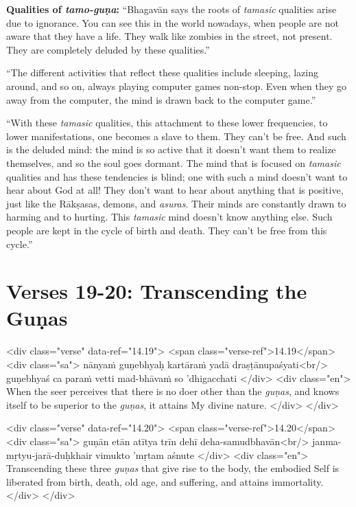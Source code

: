 \textbf{Qualities of \textit{tamo-guṇa}:} \enquote{Bhagavān says the roots of \textit{tamasic} qualities arise due to ignorance. You can see this in the world nowadays, when people are not aware that they have a life. They walk like zombies in the street, not present. They are completely deluded by these qualities.}

\enquote{The different activities that reflect these qualities include sleeping, lazing around, and so on, always playing computer games non-stop. Even when they go away from the computer, the mind is drawn back to the computer game.}

\enquote{With these \textit{tamasic} qualities, this attachment to these lower frequencies, to lower manifestations, one becomes a slave to them. They can’t be free. And such is the deluded mind: the mind is so active that it doesn’t want them to realize themselves, and so the soul goes dormant. The mind that is focused on \textit{tamasic} qualities and has these tendencies is blind; one with such a mind doesn’t want to hear about God at all! They don’t want to hear about anything that is positive, just like the Rākṣasas, demons, and \textit{asuras}. Their minds are constantly drawn to harming and to hurting. This \textit{tamasic} mind doesn’t know anything else. Such people are kept in the cycle of birth and death. They can’t be free from this cycle.}

\section{Verses 19-20: Transcending the Guṇas}\label{sec-verses-19-20-transcending-the-gunas}


\begin{html}
<div class="verse" data-ref="14.19">
  <span class="verse-ref">14.19</span>
  <div class="sa">
    nānyaṁ guṇebhyaḥ kartāraṁ yadā draṣṭānupaśyati<br/>
    guṇebhyaś ca paraṁ vetti mad-bhāvaṁ so ’dhigacchati
  </div>
  <div class="en">
    When the seer perceives that there is no doer other than the \textit{guṇas}, and knows itself to be superior to the \textit{guṇas}, it attains My divine nature.
  </div>
</div>
\end{html}



\begin{html}
<div class="verse" data-ref="14.20">
  <span class="verse-ref">14.20</span>
  <div class="sa">
    guṇān etān atītya trīn dehī deha-samudbhavān<br/>
    janma-mṛtyu-jarā-duḥkhair vimukto ’mṛtam aśnute
  </div>
  <div class="en">
    Transcending these three \textit{guṇas} that give rise to the body, the embodied Self is liberated from birth, death, old age, and suffering, and attains immortality.
  </div>
</div>
\end{html}



